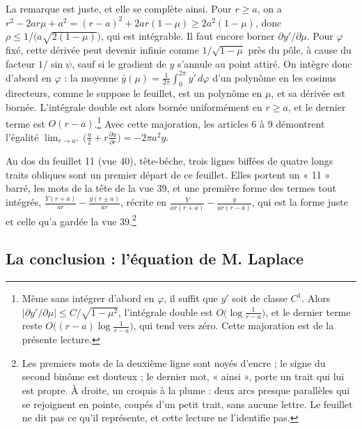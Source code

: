 \documentclass[11pt,a4paper]{article}
\begin{document}
La remarque est juste, et elle se complète ainsi. Pour \(r\ge a\), on a
\(r^2-2ar\mu+a^2=(r-a)^2+2ar(1-\mu)\ge 2a^2(1-\mu)\), donc
\(\rho\le1/\bigl(a\sqrt{2(1-\mu)}\bigr)\), qui est intégrable. Il faut encore
borner \(\partial y'/\partial\mu\). Pour \(\varphi\) fixé, cette dérivée peut
devenir infinie comme \(1/\sqrt{1-\mu}\) près du pôle, à cause du facteur
\(1/\sin\psi\), sauf si le gradient de \(y\) s'annule au point attiré. On
intègre donc d'abord en \(\varphi\) : la moyenne
\(\bar y(\mu)=\frac1{2\pi}\int_0^{2\pi}y'\,d\varphi\) d'un polynôme en les
cosinus directeurs, comme le suppose le feuillet, est un polynôme en \(\mu\),
et sa dérivée est bornée. L'intégrale double est alors bornée uniformément en
\(r\ge a\), et le dernier terme est \(O(r-a)\).\footnote{Même sans intégrer
d'abord en \(\varphi\), il suffit que \(y'\) soit de classe \(C^1\). Alors
\(|\partial y'/\partial\mu|\le C/\sqrt{1-\mu^2}\), l'intégrale double est
\(O\bigl(\log\frac1{r-a}\bigr)\), et le dernier terme reste
\(O\bigl((r-a)\log\frac1{r-a}\bigr)\), qui tend vers zéro. Cette majoration est
de la présente lecture.} Avec cette majoration, les articles 6 à 9 démontrent
l'égalité \(\lim_{r\to a^+}\bigl(\frac u2+r\frac{\partial u}{\partial r}\bigr)
=-2\pi a^2y\).

Au dos du feuillet 11 (vue 40), tête-bêche, trois lignes biffées de quatre
longs traits obliques sont un premier départ de ce feuillet. Elles portent un
« 11 » barré, les mots de la tête de la vue 39, et une première forme des
termes tout intégrés, \(\frac{Y(r+a)}{ar}-\frac{y(r\pm a)}{ar}\), récrite en
\(\frac{Y}{ar(r+a)}-\frac{y}{ar(r-a)}\), qui est la forme juste et celle
qu'a gardée la vue 39.\footnote{Les premiers mots de la deuxième ligne sont
noyés d'encre ; le signe du second binôme est douteux ; le dernier mot,
« ainsi », porte un trait qui lui est propre. À droite, un croquis à la
plume : deux arcs presque parallèles qui se rejoignent en pointe, coupés d'un
petit trait, sans aucune lettre. Le feuillet ne dit pas ce qu'il représente,
et cette lecture ne l'identifie pas.}

\subsection*{La conclusion : l'équation de M. Laplace}
\end{document}
